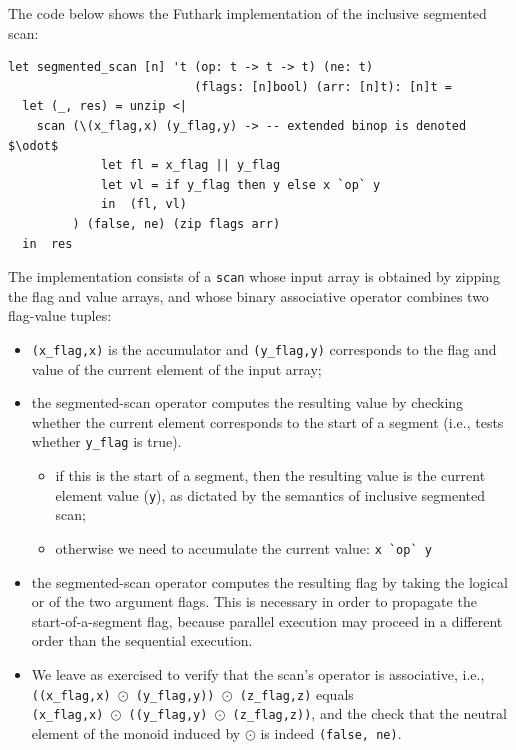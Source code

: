 \documentclass[acmsmall,review]{acmart}\settopmatter{printfolios=true,printccs=false,printacmref=false}
\begin{document}
The code below shows the Futhark implementation of the inclusive segmented scan:
\begin{lstlisting}[mathescape=true]
let segmented_scan [n] 't (op: t -> t -> t) (ne: t)
                          (flags: [n]bool) (arr: [n]t): [n]t =
  let (_, res) = unzip <|
    scan (\(x_flag,x) (y_flag,y) -> -- extended binop is denoted $\odot$
             let fl = x_flag || y_flag
             let vl = if y_flag then y else x `op` y
             in  (fl, vl)
         ) (false, ne) (zip flags arr)
  in  res
\end{lstlisting}\vspace{-2ex}
The implementation consists of a \lstinline{scan} whose
input array is obtained by zipping the flag and value arrays, and
whose binary associative operator combines two flag-value tuples:
\begin{itemize}
    \item {\tt (x\_flag,x)} is the accumulator and {\tt (y\_flag,y)} 
        corresponds to the flag and value of the current element of 
        the input array;
    \item  the segmented-scan operator computes the resulting value
        by checking whether the current element corresponds to the start
        of a segment (i.e., tests whether {\tt y\_flag} is true).
        \begin{itemize}
            \item if this is the start of a segment, then
                the resulting value is the current element
                value ({\tt y}), as dictated by the semantics
                of inclusive segmented scan;
            \item otherwise we need to accumulate the current
                value: \lstinline{x `op` y}
        \end{itemize}
    \item the segmented-scan operator computes the resulting flag
        by taking the logical or of the two argument flags. This is
        necessary in order to propagate the start-of-a-segment flag,
        because parallel execution may proceed in a different order
        than the sequential execution. 
    \item We leave as exercised to verify that the scan's operator is 
        associative, i.e.,\\
        {\tt ((x\_flag,x) $\odot$ (y\_flag,y)) $\odot$ (z\_flag,z)} equals\\
        {\tt (x\_flag,x) $\odot$ ((y\_flag,y) $\odot$ (z\_flag,z))},
        and the check that the neutral element
        of the monoid induced by $\odot$ is indeed \lstinline{(false, ne)}.
\end{itemize}
\end{document}
